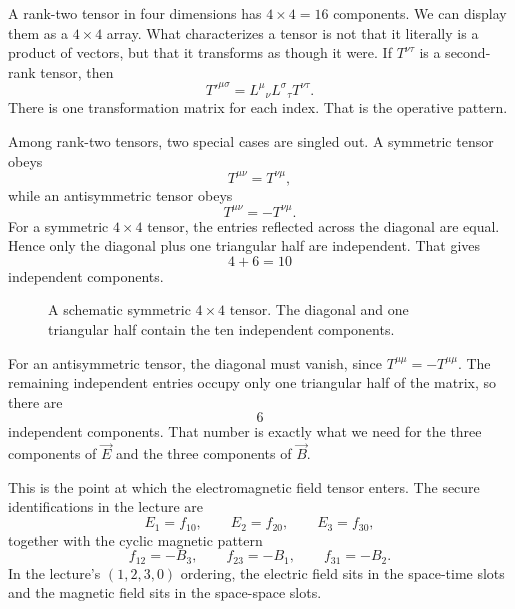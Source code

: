 A rank-two tensor in four dimensions has \(4\times 4=16\) components. We can display them as a \(4\times 4\) array. What characterizes a tensor is not that it literally is a product of vectors, but that it transforms as though it were. If \(T^{\nu\tau}\) is a second-rank tensor, then
\begin{equation}
T'^{\mu\sigma}=L^{\mu}{}_{\nu}L^{\sigma}{}_{\tau}T^{\nu\tau}.
\end{equation}
There is one transformation matrix for each index. That is the operative pattern.

Among rank-two tensors, two special cases are singled out. A symmetric tensor obeys
\begin{equation}
T^{\mu\nu}=T^{\nu\mu},
\end{equation}
while an antisymmetric tensor obeys
\begin{equation}
T^{\mu\nu}=-T^{\nu\mu}.
\end{equation}
For a symmetric \(4\times 4\) tensor, the entries reflected across the diagonal are equal. Hence only the diagonal plus one triangular half are independent. That gives
\begin{equation}
4+6=10
\end{equation}
independent components.

\begin{figure}
\centering
{}
\caption{A schematic symmetric \(4\times 4\) tensor. The diagonal and one triangular half contain the ten independent components.}
\end{figure}

For an antisymmetric tensor, the diagonal must vanish, since \(T^{\mu\mu}=-T^{\mu\mu}\). The remaining independent entries occupy only one triangular half of the matrix, so there are
\begin{equation}
6
\end{equation}
independent components. That number is exactly what we need for the three components of \(\vec E\) and the three components of \(\vec B\).

This is the point at which the electromagnetic field tensor enters. The secure identifications in the lecture are
\begin{equation}
E_1=f_{10},\qquad E_2=f_{20},\qquad E_3=f_{30},
\end{equation}
together with the cyclic magnetic pattern
\begin{equation}
f_{12}=-B_3,\qquad f_{23}=-B_1,\qquad f_{31}=-B_2.
\end{equation}
In the lecture's \((1,2,3,0)\) ordering, the electric field sits in the space-time slots and the magnetic field sits in the space-space slots.

